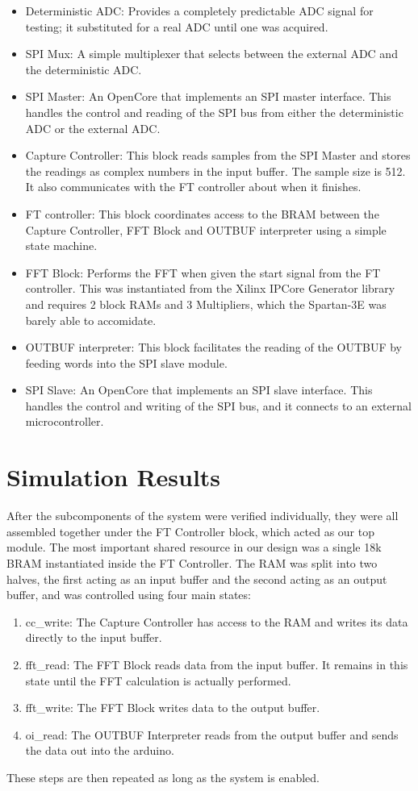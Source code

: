 \documentclass[12pt]{article}
\begin{document}
    \begin{itemize}
      \item Deterministic ADC: Provides a completely predictable ADC signal for testing; it substituted for a real ADC until one was acquired.
      \item SPI Mux: A simple multiplexer that selects between the external ADC and the deterministic ADC.
      \item SPI Master: An OpenCore that implements an SPI master interface. This handles the control and reading of the SPI bus from either the deterministic ADC or the external ADC.
      \item Capture Controller: This block reads samples from the SPI Master and stores the readings as complex numbers in the input buffer. The sample size is 512. It also communicates with the FT controller about when it finishes.
      \item FT controller: This block coordinates access to the BRAM between the Capture Controller, FFT Block and OUTBUF interpreter using a simple state machine.
      \item FFT Block: Performs the FFT when given the start signal from the FT controller. This was instantiated from the Xilinx IPCore Generator library and requires 2 block RAMs and 3 Multipliers, which the Spartan-3E was barely able to accomidate.
      \item OUTBUF interpreter: This block facilitates the reading of the OUTBUF by feeding words into the SPI slave module.
      \item SPI Slave: An OpenCore that implements an SPI slave interface. This handles the control and writing of the SPI bus, and it connects to an external microcontroller.
    \end{itemize}

  \section*{Simulation Results}
    After the subcomponents of the system were verified individually, they were all assembled together under the FT Controller block, which acted as our top module.
    The most important shared resource in our design was a single 18k BRAM instantiated inside the FT Controller.
    The RAM was split into two halves, the first acting as an input buffer and the second acting as an output buffer, and was controlled using four main states: 
    \begin{enumerate}
      \item cc\_write: The Capture Controller has access to the RAM and writes its data directly to the input buffer.
      \item fft\_read: The FFT Block reads data from the input buffer.  It remains in this state until the FFT calculation is actually performed.
      \item fft\_write: The FFT Block writes data to the output buffer.
      \item oi\_read: The OUTBUF Interpreter reads from the output buffer and sends the data out into the arduino.
    \end{enumerate}
    These steps are then repeated as long as the system is enabled.\\
    
\end{document}
